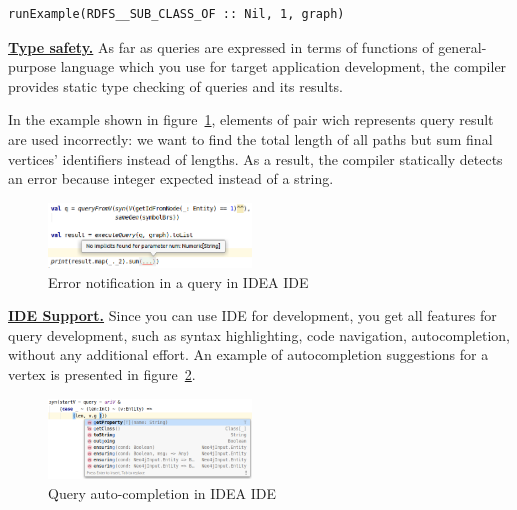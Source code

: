 \begin{lstlisting}
runExample(RDFS__SUB_CLASS_OF :: Nil, 1, graph)
\end{lstlisting}



\underline{\textbf{Type safety.}}
As far as queries are expressed in terms of functions of general-purpose language which you use for target application development, the compiler provides static type checking of queries and its results. 

In the example shown in figure~\ref{fig:types}, elements of pair wich represents query result are used incorrectly: we want to find the total length of all paths but sum final vertices' identifiers instead of lengths.
As a result, the compiler statically detects an error because integer expected instead of a string.

\begin{figure}[ht]
   \includegraphics[width=0.48\textwidth]{pictures/image.png}
   \caption{Error notification in a query in IDEA IDE}
   \label{fig:types}
\end{figure}

\underline{\textbf{IDE Support.}}
Since you can use IDE for development, you get all features for query development, such as syntax highlighting, code navigation, autocompletion, without any additional effort.
An example of autocompletion suggestions for a vertex is presented in figure~\ref{fig:autocompletion}.

\begin{figure}[ht]
    \centering
    \includegraphics[width=0.48\textwidth]{pictures/image1.png}
    \caption{Query auto-completion in IDEA IDE}
    \label{fig:autocompletion}
\end{figure}
